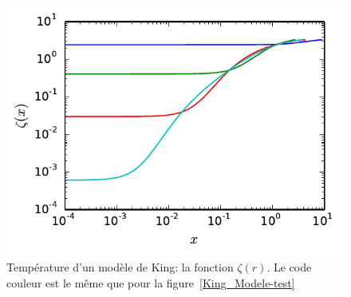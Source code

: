 \begin{figure}[hbt]
	\centering \includegraphics{graphe/zeta_func.pdf}
	\caption{Température d'un modèle de King: la fonction $\zeta(r)$. Le code couleur est le même que pour la figure~\ref{King_Modele-test}\label{Fig::King::ZetaFunc}}
\end{figure}

